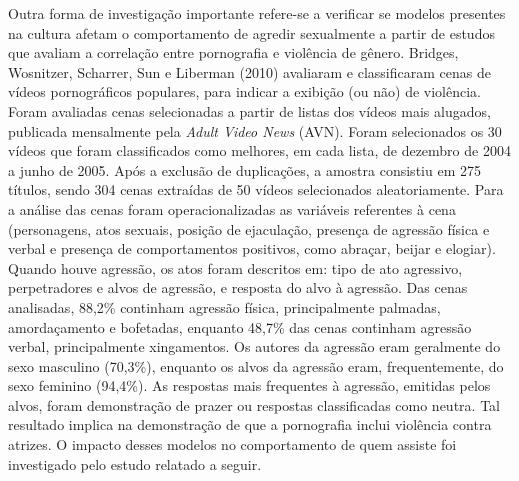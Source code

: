 Outra forma de investigação importante refere-se a verificar se modelos presentes na cultura afetam o comportamento de agredir sexualmente a partir de estudos que avaliam a correlação entre pornografia e violência de gênero. Bridges, Wosnitzer, Scharrer, Sun e Liberman (2010) avaliaram e classificaram cenas de vídeos pornográficos populares, para indicar a exibição (ou não) de violência. Foram avaliadas cenas selecionadas a partir de listas dos vídeos mais alugados, publicada mensalmente pela \textit{Adult Video News} (AVN). Foram selecionados os 30 vídeos que foram classificados como melhores, em cada lista, de dezembro de 2004 a junho de 2005. Após a exclusão de duplicações, a amostra consistiu em 275 títulos, sendo 304 cenas extraídas de 50 vídeos selecionados aleatoriamente. Para a análise das cenas foram operacionalizadas as variáveis referentes à cena (personagens, atos sexuais, posição de ejaculação, presença de agressão física e verbal e presença de comportamentos positivos, como abraçar, beijar e elogiar). Quando houve agressão, os atos foram descritos em: tipo de ato agressivo, perpetradores e alvos de agressão, e resposta do alvo à agressão. Das cenas analisadas, 88,2\% continham agressão física, principalmente palmadas, amordaçamento e bofetadas, enquanto 48,7\% das cenas continham agressão verbal, principalmente xingamentos. Os autores da agressão eram geralmente do sexo masculino (70,3\%), enquanto os alvos da agressão eram, frequentemente, do sexo feminino (94,4\%). As respostas mais frequentes à agressão, emitidas pelos alvos, foram demonstração de prazer ou respostas classificadas como neutra. Tal resultado implica na demonstração de que a pornografia inclui violência contra atrizes. O impacto desses modelos no comportamento de quem assiste foi investigado pelo estudo relatado a seguir.


